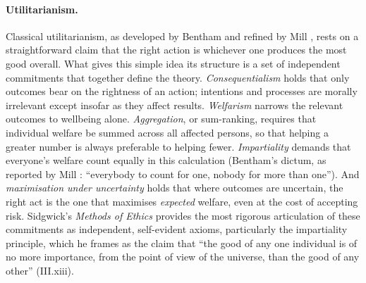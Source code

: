 \documentclass[10pt,twocolumn,a4paper]{article}
\begin{document}
\paragraph{Utilitarianism.} Classical utilitarianism, as developed by Bentham
\cite{bentham1789} and refined by Mill \cite{mill1863}, rests on a
straightforward claim that the right action is whichever one produces the most
good overall. What gives this simple idea its structure is a set of independent
commitments that together define the theory. \emph{Consequentialism} holds that
only outcomes bear on the rightness of an action; intentions and processes are
morally irrelevant except insofar as they affect results. \emph{Welfarism}
narrows the relevant outcomes to wellbeing alone. \emph{Aggregation}, or
sum-ranking, requires that individual welfare be summed across all affected
persons, so that helping a greater number is always preferable to helping fewer.
\emph{Impartiality} demands that everyone's welfare count equally in this
calculation (Bentham's dictum, as reported by Mill \cite{mill1863}: ``everybody
to count for one, nobody for more than one''). And \emph{maximisation under
uncertainty} holds that where outcomes are uncertain, the right act is the one
that maximises \emph{expected} welfare, even at the cost of accepting risk.
Sidgwick's \emph{Methods of Ethics} \cite{sidgwick1907} provides the most
rigorous articulation of these commitments as independent, self-evident axioms,
particularly the impartiality principle, which he frames as the claim that ``the
good of any one individual is of no more importance, from the point of view of
the universe, than the good of any other'' (III.xiii).
\end{document}
